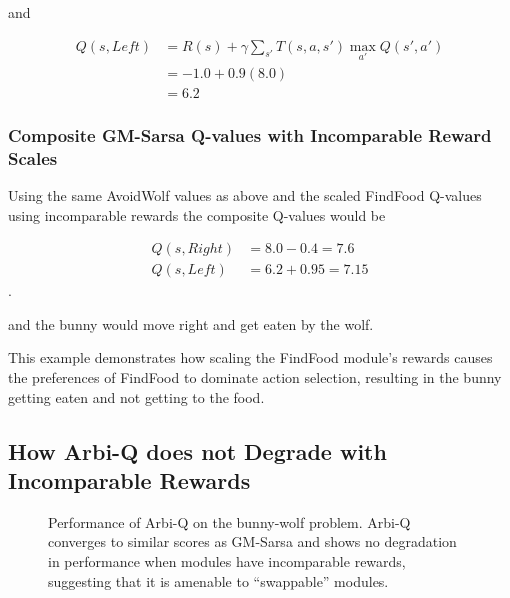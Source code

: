 and

\begin{align*}
Q(s, Left) &= R(s) + \gamma \sum_{s'} T(s, a, s') \max_{a'} Q(s', a')\\
             &= -1.0 + 0.9 (8.0)\\
             &= 6.2
\end{align*}

\subsubsection{Composite GM-Sarsa Q-values with Incomparable Reward Scales}

Using the same AvoidWolf values as above and the scaled FindFood Q-values using incomparable rewards the composite Q-values would be

\begin{align*}
  Q(s, Right) &= 8.0 - 0.4 = 7.6\\
  Q(s, Left) &= 6.2 + 0.95 = 7.15
\end{align*}.

and the bunny would move right and get eaten by the wolf.

This example demonstrates how scaling the FindFood module's rewards causes the preferences of FindFood to dominate action selection, resulting in the bunny getting eaten and not getting to the food.

\subsection{How Arbi-Q does not Degrade with Incomparable Rewards}

\begin{figure}[ht]
  \begin{center}
    \caption{Performance of Arbi-Q on the bunny-wolf problem. Arbi-Q converges to similar scores as GM-Sarsa and shows no degradation in performance when modules have incomparable rewards, suggesting that it is amenable to ``swappable'' modules.}
  \end{center}
  \label{fig:arbiq--results}
\end{figure}

